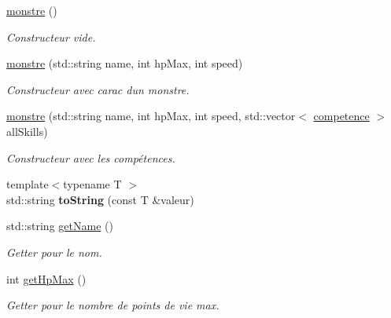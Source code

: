 \begin{DoxyCompactItemize}
\item 
\mbox{\label{classmonstre_a718cb1c5f9297f00e42e6b884ca85d6d}} 
\hyperlink{classmonstre_a718cb1c5f9297f00e42e6b884ca85d6d}{monstre} ()
\begin{DoxyCompactList}\small\item\em Constructeur vide. \end{DoxyCompactList}\item 
\hyperlink{classmonstre_a3a6290dca4b99876fe846e02e4ce140d}{monstre} (std\+::string name, int hp\+Max, int speed)
\begin{DoxyCompactList}\small\item\em Constructeur avec carac d\textquotesingle{}un monstre. \end{DoxyCompactList}\item 
\hyperlink{classmonstre_ab28517ab4e9898d3d079f2caa7cc5953}{monstre} (std\+::string name, int hp\+Max, int speed, std\+::vector$<$ \hyperlink{classcompetence}{competence} $>$ all\+Skills)
\begin{DoxyCompactList}\small\item\em Constructeur avec les compétences. \end{DoxyCompactList}\item 
\mbox{\label{classmonstre_aea06290b33132d84afffd3f40f651891}} 
{\footnotesize template$<$typename T $>$ }\\std\+::string {\bfseries to\+String} (const T \&valeur)
\item 
\mbox{\label{classmonstre_ae166adf286161a19ee0bc8e5c14fc8f5}} 
std\+::string \hyperlink{classmonstre_ae166adf286161a19ee0bc8e5c14fc8f5}{get\+Name} ()
\begin{DoxyCompactList}\small\item\em Getter pour le nom. \end{DoxyCompactList}\item 
\mbox{\label{classmonstre_aefac39c9ae67b300c2a69bfdd29662b2}} 
int \hyperlink{classmonstre_aefac39c9ae67b300c2a69bfdd29662b2}{get\+Hp\+Max} ()
\begin{DoxyCompactList}\small\item\em Getter pour le nombre de points de vie max. \end{DoxyCompactList}\item 

\end{DoxyCompactItemize}
